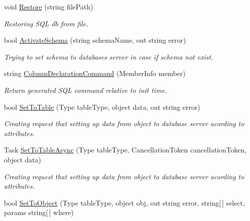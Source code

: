 \begin{DoxyCompactItemize}
void \mbox{\hyperlink{interface_uniform_data_operator_1_1_sql_1_1_i_sql_operator_acf6fdbfc57a21efc371e0772244defd5}{Restore}} (string file\+Path)
\begin{DoxyCompactList}\small\item\em Restoring S\+QL db from file. \end{DoxyCompactList}\item 
bool \mbox{\hyperlink{interface_uniform_data_operator_1_1_sql_1_1_i_sql_operator_a5ae8328a464ef80f1ae1bd46a573c265}{Activate\+Schema}} (string schema\+Name, out string error)
\begin{DoxyCompactList}\small\item\em Trying to set schema to databases server in case if schema not exist. \end{DoxyCompactList}\item 
string \mbox{\hyperlink{interface_uniform_data_operator_1_1_sql_1_1_i_sql_operator_aac9c3ed1e73af66e383340a154786ec7}{Column\+Declaration\+Command}} (Member\+Info member)
\begin{DoxyCompactList}\small\item\em Return generated S\+QL command relative to init time. \end{DoxyCompactList}\item 
bool \mbox{\hyperlink{interface_uniform_data_operator_1_1_sql_1_1_i_sql_operator_ad05106eb6bd1a50f35b476a42821dfa3}{Set\+To\+Table}} (Type table\+Type, object data, out string error)
\begin{DoxyCompactList}\small\item\em Creating request that setting up data from object to database server acording to attributes. \end{DoxyCompactList}\item 
Task \mbox{\hyperlink{interface_uniform_data_operator_1_1_sql_1_1_i_sql_operator_a35ef3899954f213e391751e9cda09322}{Set\+To\+Table\+Async}} (Type table\+Type, Cancellation\+Token cancellation\+Token, object data)
\begin{DoxyCompactList}\small\item\em Creating request that setting up data from object to database server acording to attributes. \end{DoxyCompactList}\item 
bool \mbox{\hyperlink{interface_uniform_data_operator_1_1_sql_1_1_i_sql_operator_a9a1822fcafcb1a3abd59b40f2cef7930}{Set\+To\+Object}} (Type table\+Type, object obj, out string error, string\mbox{[}$\,$\mbox{]} select, params string\mbox{[}$\,$\mbox{]} where)

\end{DoxyCompactItemize}
